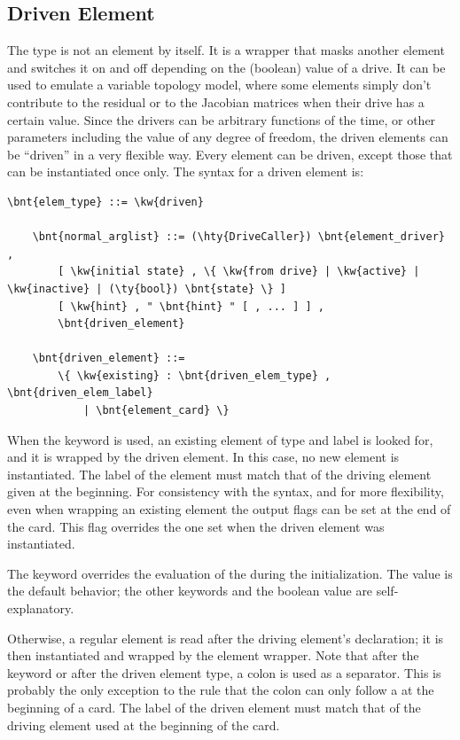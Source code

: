 \subsection{Driven Element}\label{sec:EL:BASE:DRIVEN}
The  type is not an element by itself. It is a wrapper that
masks another element and switches it on and off depending on the (boolean)
value of a drive. It can be used to emulate a variable topology model,
where some elements simply don't contribute to the residual
or to the Jacobian matrices when their drive has a certain value.
Since the drivers can be arbitrary functions of the time, 
or other parameters including the value of any degree of freedom, 
the driven elements can be ``driven'' in a very flexible way.
Every element can be driven, except those that can be instantiated once only.
The syntax for a driven element is:
\begin{Verbatim}[commandchars=\\\{\}]
    \bnt{elem_type} ::= \kw{driven}

    \bnt{normal_arglist} ::= (\hty{DriveCaller}) \bnt{element_driver} ,
        [ \kw{initial state} , \{ \kw{from drive} | \kw{active} | \kw{inactive} | (\ty{bool}) \bnt{state} \} ]
        [ \kw{hint} , " \bnt{hint} " [ , ... ] ] ,
        \bnt{driven_element}

    \bnt{driven_element} ::=
        \{ \kw{existing} : \bnt{driven_elem_type} , \bnt{driven_elem_label}
            | \bnt{element_card} \}
\end{Verbatim}
When the keyword  is used, an existing element 
of type  and label  is looked for, 
and it is wrapped by the driven element.
In this case, no new element is instantiated.
The label of the element must match that of the driving element given 
at the beginning.
For consistency with the syntax, and for more flexibility, 
even when wrapping an existing element the output flags can be set
at the end of the card.
This flag overrides the one set when the driven element was instantiated.

The  keyword overrides the evaluation of the 
during the initialization.  The value  is the default behavior;
the other keywords and the boolean value  are self-explanatory.

Otherwise, a regular element is read after the driving element's declaration;
it is then instantiated and wrapped by the  element wrapper.
Note that after the keyword  or after the driven element type,
a colon is used as a separator.
This is probably the only exception to the rule that the colon
can only follow a  at the beginning of a card.
The label  of the driven element must match that
of the driving element used at the beginning of the  card.

